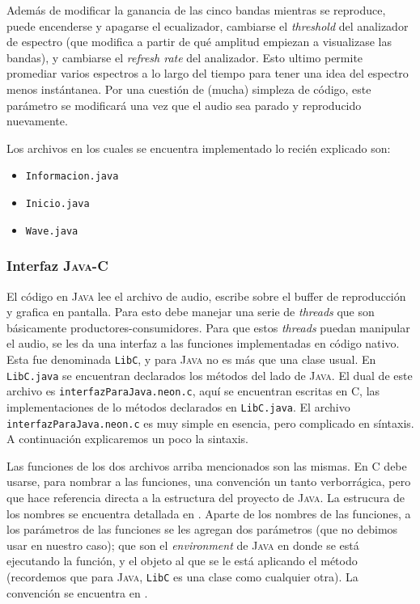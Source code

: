\documentclass[%
    compressed,
    titlepage,
    narroweqnarray,
    inline,
    twoside,
    ]{ieee}
\begin{document}
Adem\'as de modificar la ganancia de las cinco bandas mientras se reproduce, puede encenderse y apagarse el ecualizador,
cambiarse el \textit{threshold} del analizador de espectro (que modifica a partir de qu\'e amplitud empiezan a visualizase las bandas), y
cambiarse el \textit{refresh rate} del analizador. Esto ultimo permite promediar varios espectros a lo largo del tiempo para
tener una idea del espectro menos inst\'antanea. Por una cuesti\'on de (mucha) simpleza de c\'odigo, este par\'ametro se modificar\'a
una vez que el audio sea parado y reproducido nuevamente.

Los archivos en los cuales se encuentra implementado lo reci\'en explicado son:
\begin{itemize}
    \item \texttt{Informacion.java}
    \item \texttt{Inicio.java}
    \item \texttt{Wave.java}
\end{itemize}

\subsubsection{Interfaz \textsc{Java}-\textsc{C}}
El c\'odigo en \textsc{Java} lee el archivo de audio, escribe sobre el buffer de reproducci\'on y grafica en pantalla.
Para esto debe manejar una serie de \textit{threads} que son b\'asicamente productores-consumidores.
Para que estos \textit{threads} puedan manipular el audio, se les da una interfaz a las funciones implementadas en c\'odigo
nativo. Esta fue denominada \texttt{LibC}, y para \textsc{Java} no es m\'as que una clase usual. En \texttt{LibC.java} se encuentran
declarados los m\'etodos del lado de \textsc{Java}. El dual de este archivo es \texttt{interfazParaJava.neon.c}, aqu\'i se encuentran escritas en
\textsc{C}, las implementaciones de lo m\'etodos declarados en \texttt{LibC.java}. El archivo \texttt{interfazParaJava.neon.c} es muy simple
en esencia, pero complicado en s\'intaxis. A continuaci\'on explicaremos un poco la sintaxis.

Las funciones de los dos archivos arriba mencionados son las mismas. En \textsc{C} debe usarse, para nombrar a las funciones, una
convenci\'on un tanto verborr\'agica, pero que hace referencia directa a la estructura del proyecto de \textsc{Java}. La estrucura de los nombres
se encuentra detallada en \cite[Chapter 2: Resolving Native Method Names]{jni}.
Aparte de los nombres de las funciones, a los par\'ametros de las funciones se les agregan dos par\'ametros (que no debimos usar en nuestro caso);
que son el \textit{environment} de \textsc{Java} en donde se est\'a ejecutando la funci\'on, y el objeto al que se le est\'a aplicando
el m\'etodo (recordemos que para \textsc{Java}, \texttt{LibC} es una clase como cualquier otra).
La convenci\'on se encuentra en \cite[Chapter 2: Native Method Arguments]{jni}. 
\end{document}
